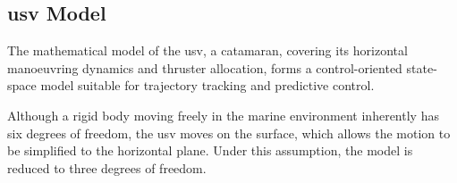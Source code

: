 \subsection{\texorpdfstring{\gls{usv} Model}{USV Model}}
\label{sec:mod_usv}

The mathematical model of the \gls{usv}, a catamaran, covering its horizontal manoeuvring dynamics and thruster allocation, forms a control-oriented state-space model suitable for trajectory tracking and predictive control.

Although a rigid body moving freely in the marine environment inherently has six degrees of freedom, the \gls{usv} moves on the surface, which allows the motion to be simplified to the horizontal plane. Under this assumption, the model is reduced to three degrees of freedom.

